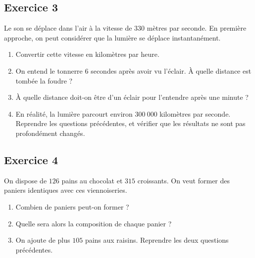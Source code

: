 \documentclass[14 pt]{extarticle}
\theoremstyle{plain}
\begin{document}
 
\subsection*{Exercice 3} 

Le son se déplace dans l'air à la vitesse de $330$ mètres par seconde. En première approche, on peut considérer que la lumière se déplace instantanément. 
\begin{enumerate}
\item Convertir cette vitesse en kilomètres par heure. 
\item On entend le tonnerre $6$ secondes après avoir vu l'éclair. À quelle distance est tombée la foudre ? 
\item À quelle distance doit-on être d'un éclair pour l'entendre après une minute ? 
\item En réalité, la lumière parcourt environ $300\ 000$ kilomètres par seconde. Reprendre les questions précédentes, 
et vérifier que les résultats ne sont pas profondément changés. 
\end{enumerate}


\subsection*{Exercice 4}

On dispose de $126$ pains au chocolat et $315$ croissants. On veut former des paniers identiques avec ces viennoiseries. 

\begin{enumerate}
\item Combien de paniers peut-on former ? 
\item Quelle sera alors la composition de chaque panier ? 
\item On ajoute de plus $105$ pains aux raisins. Reprendre les deux questions précédentes. 
\end{enumerate}




 	
\end{document}
